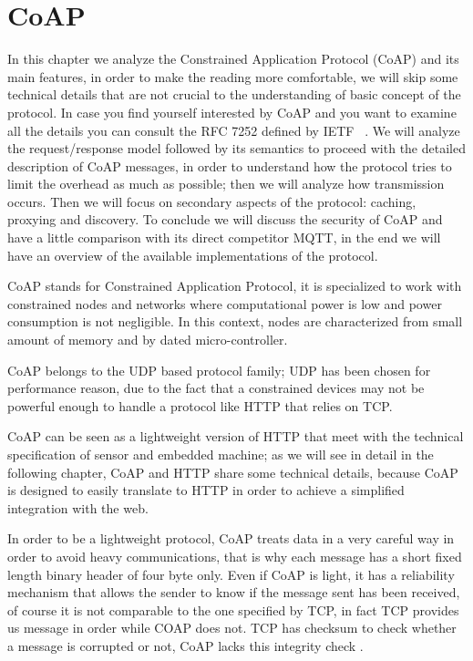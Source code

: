 
	\chapter{CoAP}\label{ch:coap}
	In this chapter we analyze the Constrained Application Protocol (CoAP) and its main features, in order to make the reading more comfortable,
	we will skip some technical details that are not crucial to the understanding of basic concept of the protocol.\newline
	In case you find yourself interested by CoAP and you want to examine all the details you can consult
	the RFC 7252 defined by IETF ~\cite{rfccoap}. \newline
	We will analyze the request/response model followed by its semantics to proceed with the detailed description of CoAP messages, in order to understand how the protocol tries to limit the overhead as much as possible; then we will analyze how transmission occurs.\newline
	Then we will focus on secondary aspects of the protocol: caching, proxying and discovery.\newline
	To conclude we will discuss the security of CoAP and have a little comparison with its direct competitor MQTT, in the end we will have an overview of the available implementations of the protocol.\newline
	
	CoAP stands for Constrained Application Protocol, it is specialized to work with constrained nodes and networks where computational power is low and power consumption is not negligible.\newline
	In this context, nodes are characterized from small amount of memory and by dated micro-controller.\newline

	CoAP belongs to the UDP based protocol family; UDP has been chosen for performance reason, due to the fact that a constrained devices may not be powerful enough to handle a protocol like HTTP that relies on TCP.\newline
	
	CoAP can be seen as a lightweight version of HTTP that meet with the technical specification of sensor and embedded machine; as we will see in detail in the following chapter, CoAP and HTTP share some technical details, because CoAP is designed to easily translate to HTTP in order to achieve a simplified integration with the web.\newline

	In order to be a lightweight protocol, CoAP treats data in a very careful way in order to avoid heavy communications, that is why each message has a short fixed length binary header of four byte only. Even if CoAP is light, it has a reliability mechanism that allows the sender to know if the message sent has been received, of course it is not comparable to the one specified by TCP, in fact TCP provides us message in order while COAP does not.
	TCP has checksum to check whether a message is corrupted or not, CoAP lacks this integrity check .\newline
	

